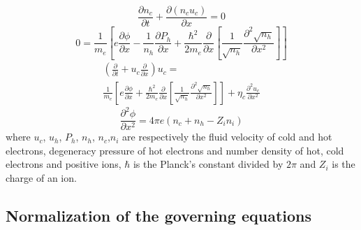 \documentclass[journal]{IEEEtran}
\begin{document}
\begin{equation}\label{eq6}
\frac{\partial n_{c}}{\partial t}+\frac{\partial\left(n_{c} u_{c}\right)}{\partial x}=0
\end{equation}
\begin{equation}\label{eq7}
0=\frac{1}{m_{e}}\left[e \frac{\partial \phi}{\partial x}-\frac{1}{n_{h}} \frac{\partial P_{h}}{\partial x}+\frac{\hbar^{2}}{2 m_{e}} \frac{\partial}{\partial x}\left[\frac{1}{\sqrt{n_{h}}} \frac{\partial^{2} \sqrt{n_{h}}}{\partial x^{2}}\right]\right]
\end{equation}
\begin{multline}\label{eq8}
\left(\frac{\partial}{\partial t}+u_{c} \frac{\partial}{\partial x}\right) u_{c} =\\ \frac{1}{m_{e}}\left[e \frac{\partial \phi}{\partial x}+\frac{\hbar^{2}}{2 m_{e}} \frac{\partial}{\partial x}\left[\frac{1}{\sqrt{n_{h}}} \frac{\partial^{2} \sqrt{n_{h}}}{\partial x^{2}}\right] \right]+\eta_{c} \frac{\partial^{2} u_{c}}{\partial x^{2}}
\end{multline}
\begin{equation}\label{eq9}
\frac{\partial^{2} \phi}{\partial x^{2}}=4 \pi e \left(n_{c}+n_{h}-Z_{i} n_{i}\right)
\end{equation}
where $u_c$, $u_h$, $P_h$, $n_h$, $n_c$,$n_i$ are respectively the fluid velocity of cold and hot electrons, degeneracy pressure of hot electrons and number density of hot, cold electrons and positive ions, $\hbar$ is the Planck’s constant divided by $2\pi$ and $Z_i$ is the charge of an ion.

\subsection{Normalization of the governing equations}\label{A}
\end{document}
